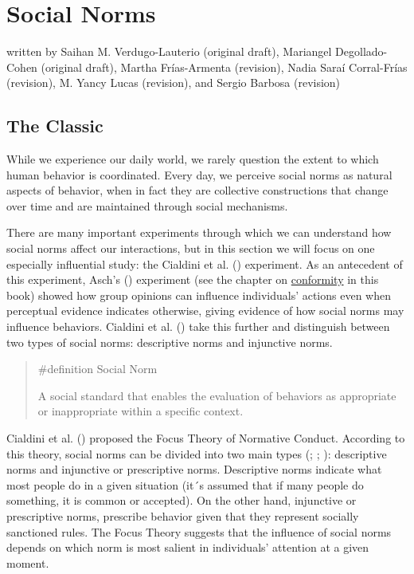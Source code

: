 \documentclass[
  letterpaper,
]{book}
\begin{document}

\chapter{\texorpdfstring{{Social
Norms}}{Social Norms}}\label{social-norms}

{written by Saihan M. Verdugo-Lauterio (original draft), Mariangel
Degollado-Cohen (original draft), Martha Frías-Armenta (revision), Nadia
Saraí Corral-Frías (revision), M. Yancy Lucas (revision), and Sergio
Barbosa (revision)}

\section{The Classic}\label{the-classic-14}

While we experience our daily world, we rarely question the extent to
which human behavior is coordinated. Every day, we perceive social norms
as natural aspects of behavior, when in fact they are collective
constructions that change over time and are maintained through social
mechanisms.

There are many important experiments through which we can understand how
social norms affect our interactions, but in this section we will focus
on one especially influential study: the Cialdini et al.
() experiment. As an antecedent
of this experiment, Asch's ()
experiment (see the chapter on \href{chapter21.qmd}{conformity} in this
book) showed how group opinions can influence individuals' actions even
when perceptual evidence indicates otherwise, giving evidence of how
social norms may influence behaviors. Cialdini et al.
() take this further and
distinguish between two types of social norms: descriptive norms and
injunctive norms.

\begin{quote}
\label{def-socialnorm}{\#definition} Social Norm

A social standard that enables the evaluation of behaviors as
appropriate or inappropriate within a specific context.
\end{quote}

Cialdini et al. () proposed the
Focus Theory of Normative Conduct. According to this theory, social
norms can be divided into two main types
(;
;
): descriptive norms
and injunctive or prescriptive norms. Descriptive norms indicate what
most people do in a given situation (it´s assumed that if many people do
something, it is common or accepted). On the other hand, injunctive or
prescriptive norms, prescribe behavior given that they represent
socially sanctioned rules. The Focus Theory suggests that the influence
of social norms depends on which norm is most salient in individuals'
attention at a given moment.
\end{document}

